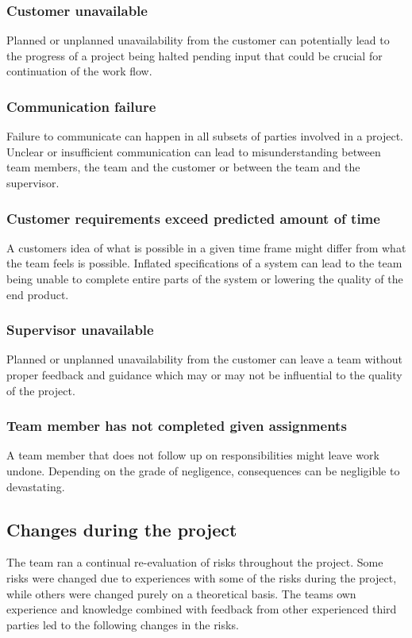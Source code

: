 \subsubsection{Customer unavailable}
Planned or unplanned unavailability from the customer can potentially lead to the progress of a project being halted pending input that could be crucial for continuation of the work flow.

\subsubsection{Communication failure}
Failure to communicate can happen in all subsets of parties involved in a project. Unclear or insufficient communication can lead to misunderstanding between team members, the team and the customer or between the team and the supervisor.

\subsubsection{Customer requirements exceed predicted amount of time}
A customers idea of what is possible in a given time frame might differ from what the team feels is possible. Inflated specifications of a system can lead to the team being unable to complete entire parts of the system or lowering the quality of the end product.

\subsubsection{Supervisor unavailable}
Planned or unplanned unavailability from the customer can leave a team without proper feedback and guidance which may or may not be influential to the quality of the project.

\subsubsection{Team member has not completed given assignments}
A team member that does not follow up on responsibilities might leave work undone. Depending on the grade of negligence, consequences can be negligible to devastating.

\subsection{Changes during the project}
The team ran a continual re-evaluation of risks throughout the project. Some risks were changed due to experiences with some of the risks during the project, while others were changed purely on a theoretical basis. The teams own experience and knowledge combined with feedback from other experienced third parties led to the following changes in the risks.

